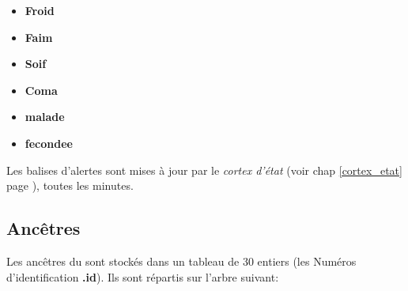 \documentclass[french]{report}
\newlength{\du}\fi
\begin{document}
\begin{itemize}
	\item \textbf{Froid}
	\item \textbf{Faim}
	\item \textbf{Soif}
	\item \textbf{Coma}
	\item \textbf{malade}
	\item \textbf{fecondee} \\
\end{itemize}

Les balises d'alertes sont mises à jour par le \textit{cortex d'état} (voir chap \ref{cortex_etat} page \pageref{cortex_etat}), toutes les minutes.\\

\subsection{Ancêtres}
Les ancêtres du \CoCiX sont stockés dans un tableau de 30 entiers (les Numéros d'identification \textbf{.id}). Ils sont répartis sur l'arbre suivant:
\end{document}
